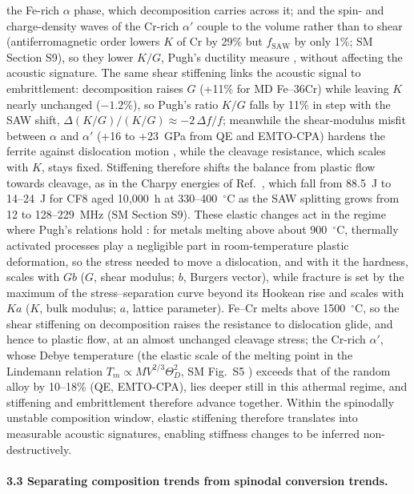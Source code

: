 \documentclass[final,3p,times]{elsarticle}
\begin{document}
the Fe-rich $\alpha$ phase, which decomposition carries across it; and the spin- and charge-density waves of the Cr-rich $\alpha'$ couple to the volume rather than to shear (antiferromagnetic order lowers $K$ of Cr by 29\% but $f_{\mathrm{SAW}}$ by only 1\%; SM Section S9), so they lower $K/G$, Pugh's ductility measure \cite{pugh1954xcii}, without affecting the acoustic signature. The same shear stiffening links the acoustic signal to embrittlement: decomposition raises $G$ (+11\% for MD Fe--36Cr) while leaving $K$ nearly unchanged ($-1.2\%$), so Pugh's ratio $K/G$ falls by 11\% \cite{pugh1954xcii} in step with the SAW shift, $\Delta(K/G)/(K/G)\approx-2\,\Delta f/f$; meanwhile the shear-modulus misfit between $\alpha$ and $\alpha'$ (+16 to +23~GPa from QE and EMTO-CPA) hardens the ferrite against dislocation motion \cite{kato1981hardening}, while the cleavage resistance, which scales with $K$, stays fixed. Stiffening therefore shifts the balance from plastic flow towards cleavage, as in the Charpy energies of Ref.~\cite{al2023detecting}, which fall from 88.5~J to 14--24~J for CF8 aged 10{,}000~h at 330--400~$^\circ$C as the SAW splitting grows from 12 to 128--229~MHz (SM Section S9). These elastic changes act in the regime where Pugh's relations hold \cite{pugh1954xcii}: for metals melting above about 900~$^\circ$C, thermally activated processes play a negligible part in room-temperature plastic deformation, so the stress needed to move a dislocation, and with it the hardness, scales with $Gb$ ($G$, shear modulus; $b$, Burgers vector), while fracture is set by the maximum of the stress--separation curve beyond its Hookean rise and scales with $Ka$ ($K$, bulk modulus; $a$, lattice parameter). Fe--Cr melts above 1500~$^\circ$C, so the shear stiffening on decomposition raises the resistance to dislocation glide, and hence to plastic flow, at an almost unchanged cleavage stress; the Cr-rich $\alpha'$, whose Debye temperature (the elastic scale of the melting point in the Lindemann relation $T_m\propto MV^{2/3}\Theta_D^2$, SM Fig.~S5 \cite{fine1984elastic}) exceeds that of the random alloy by 10--18\% (QE, EMTO-CPA), lies deeper still in this athermal regime, and stiffening and embrittlement therefore advance together. Within the spinodally unstable composition window, elastic stiffening therefore translates into measurable acoustic signatures, enabling stiffness changes to be inferred non-destructively.

\paragraph{3.3 Separating composition trends from spinodal conversion trends.}
\end{document}
